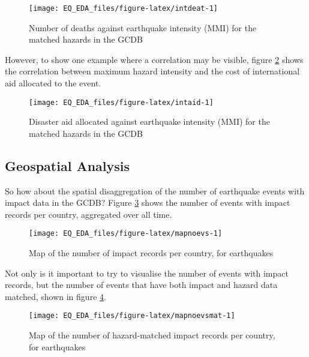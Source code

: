 \documentclass[
]{article}
\begin{document}
\begin{figure}
\texttt{[image: EQ\_EDA\_files/figure-latex/intdeat-1]} \caption[Number of deaths against earthquake intensity (MMI) for the matched hazards in the GCDB]{Number of deaths against earthquake intensity (MMI) for the matched hazards in the GCDB}\label{fig:intdeat}
\end{figure}

However, to show one example where a correlation may be visible, figure \ref{fig:intaid} shows the correlation between maximum hazard intensity and the cost of international aid allocated to the event.

\begin{figure}
\texttt{[image: EQ\_EDA\_files/figure-latex/intaid-1]} \caption[Disaster aid allocated against earthquake intensity (MMI) for the matched hazards in the GCDB]{Disaster aid allocated against earthquake intensity (MMI) for the matched hazards in the GCDB}\label{fig:intaid}
\end{figure}

\hypertarget{geospatial-analysis}{%
\subsection{Geospatial Analysis}\label{geospatial-analysis}}

So how about the spatial disaggregation of the number of earthquake events with impact data in the GCDB? Figure \ref{fig:mapnoevs} shows the number of events with impact records per country, aggregated over all time.

\begin{figure}
\texttt{[image: EQ\_EDA\_files/figure-latex/mapnoevs-1]} \caption[Map of the number of impact records per country, for earthquakes]{Map of the number of impact records per country, for earthquakes}\label{fig:mapnoevs}
\end{figure}

Not only is it important to try to visualise the number of events with impact records, but the number of events that have both impact and hazard data matched, shown in figure \ref{fig:mapnoevsmat}.

\begin{figure}
\texttt{[image: EQ\_EDA\_files/figure-latex/mapnoevsmat-1]} \caption[Map of the number of hazard-matched impact records per country, for earthquakes]{Map of the number of hazard-matched impact records per country, for earthquakes}\label{fig:mapnoevsmat}
\end{figure}
\end{document}
